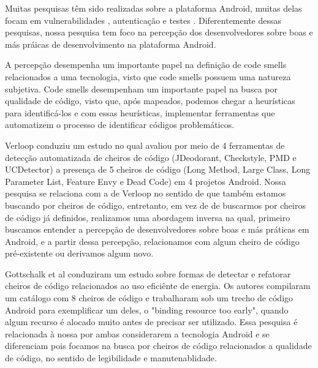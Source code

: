 

Muitas pesquisas t\^em sido realizadas sobre a plataforma Android, muitas delas focam em vulnerabilidades \cite{Y, F, G, X, P, D, E}, autentica\c{c}\~ao \cite{T, Yamashita6405287, R} e testes \cite{J, M}. Diferentemente dessas pesquisas, nossa pesquisa tem foco na percep\c{c}\~ao dos desenvolvedores sobre boas e m\'as pr\'aicas de desenvolvimento na plataforma Android. 

A percep\c{c}\~ao desempenha um importante papel na defini\c{c}\~ao de code smells relacionados a uma tecnologia, visto que code smells possuem uma natureza subjetiva. Code smells desempenham um importante papel na busca por qualidade de c\'odigo, visto que, ap\'os mapeados, podemos chegar a heur\'isticas para identific\'a-los e com essas heur\'isticas, implementar ferramentas que automatizem o processo de identificar c\'odigos problem\'aticos.

Verloop \cite{MobileSmells:13} conduziu um estudo no qual avaliou por meio de 4 ferramentas de detec\c{c}\~ao automatizada de cheiros de c\'odigo (JDeodorant, Checkstyle, PMD e UCDetector) a presen\c{c}a de 5 cheiros de c\'odigo (Long Method, Large Class, Long Parameter List, Feature Envy e Dead Code) em 4 projetos Android. Nossa pesquisa se relaciona com a de Verloop no sentido de que tamb\'em estamos buscando por cheiros de c\'odigo, entretanto, em vez de de buscarmos por cheiros de c\'odigo j\'a definidos, realizamos uma abordagem inversa na qual, primeiro buscamos entender a percep\c{c}\~ao de desenvolvedores sobre boas e m\'as pr\'aticas em Android, e a partir dessa percep\c{c}\~ao, relacionamos com algum cheiro de c\'odigo pr\'e-existente ou derivamos algum novo.

Gottschalk et al \cite{EnergyAndroidSmells} conduziram um estudo sobre formas de detectar e refatorar cheiros de c\'odigo relacionados ao uso efici\^ente de energia. Os autores compilaram um cat\'alogo com 8 cheiros de c\'odigo e trabalharam sob um trecho de c\'odigo Android para exemplificar um deles, o "binding resource too early", quando algum recurso \'e alocado muito antes de precisar ser utilizado. Essa pesquisa \'e relacionada \`a nossa por ambas considerarem a tecnologia Android e se diferenciam pois focamos na busca por cheiros de c\'odigo relacionados a qualidade de c\'odigo, no sentido de legibilidade e manutenablidade.

